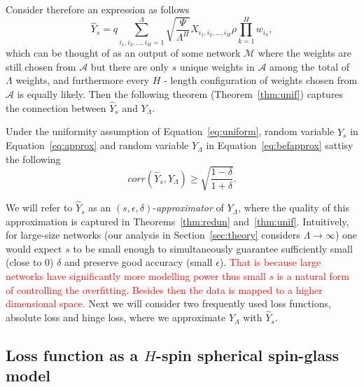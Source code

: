 \documentclass[twoside]{article}
\begin{document}
Consider therefore an expression as follows
\begin{equation}
\hat{Y}_s = q\sum_{i_1,i_2,\dots,i_H=1}^{\Lambda}\sqrt{\frac{\Psi}{\Lambda^H}}X_{i_1,i_2,\dots,i_H}\rho\prod_{k = 1}^{H}w_{i_k},
\label{eq:approx}
\end{equation}
which can be thought of as an output of some network $\mathcal{M}$ where the weights are still chosen from $\mathcal{A}$ but there are only $s$ unique weights in $\mathcal{A}$ among the total of $\Lambda$ weights, and furthermore every $H$ - length configuration of weights chosen from $\mathcal{A}$ is equally likely. Then the following theorem (Theorem~\ref{thm:unif}) captures the connection between $\hat{Y}_s$ and $Y_{\Lambda}$.

\begin{theorem}
Under the uniformity assumption of Equation~\ref{eq:uniform}, random variable $\hat{Y}_s$ in Equation~\ref{eq:approx} and random variable $Y_{\Lambda}$ in Equation~\ref{eq:befapprox} sattisy the following
\[corr(\hat{Y}_s,Y_{\Lambda}) \geq \sqrt{\frac{1-\delta}{1+\delta}}.
\]
\label{thm:unif}
\end{theorem}

We will refer to $\hat{Y}_s$ as an $(s,\epsilon,\delta)$-\textit{approximator} of $Y_{\Lambda}$, where the quality of this approximation is captured in Theorems~\ref{thm:redun} and~\ref{thm:unif}. Intuitively, for large-size networks (our analysis in Section~\ref{sec:theory} considers $\Lambda \rightarrow \infty$) one would expect $s$ to be small enough to simultaneously guarantee sufficiently small (close to $0$) $\delta$ and preserve good accuracy (small $\epsilon$). \textcolor{red}{That is because large networks have significantly more modelling power thus small $s$ is a natural form of controlling the overfitting. Besides then the data is mapped to a higher dimensional space.} Next we will consider two frequently used loss functions, absolute loss and hinge loss, where we approximate $Y_{\Lambda}$ with $\hat{Y}_s$. 

\subsection{Loss function as a $H$-spin spherical spin-glass model}
\end{document}
